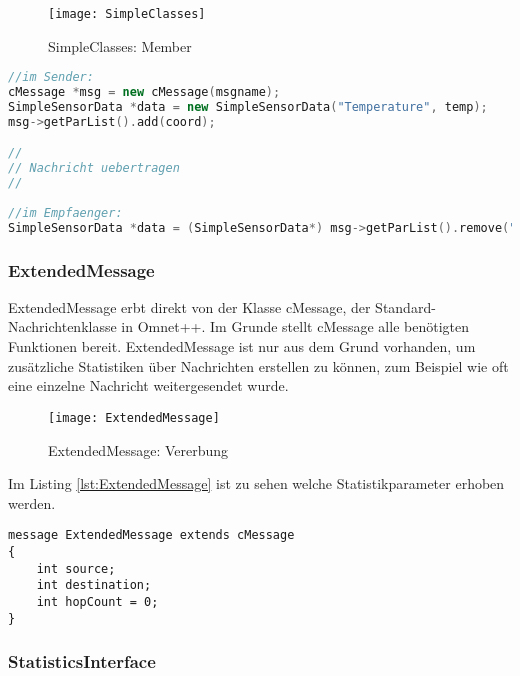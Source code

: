 \begin{figure}[htbp]
\centering
\caption{SimpleClasses: Member}
\texttt{[image: SimpleClasses]}
\end{figure}

\begin{minipage}{\textwidth}
\begin{lstlisting}[language=C++, label=lst:SimpleExample, caption=Beispiel für Senden und Empfangen mit Parameterliste]
//im Sender:
cMessage *msg = new cMessage(msgname);
SimpleSensorData *data = new SimpleSensorData("Temperature", temp);
msg->getParList().add(coord);

//
// Nachricht uebertragen    
//  
  
//im Empfaenger:  
SimpleSensorData *data = (SimpleSensorData*) msg->getParList().remove("Temperature");
\end{lstlisting}
\end{minipage}
\subsubsection{ExtendedMessage}

ExtendedMessage erbt direkt von der Klasse cMessage, der Standard-Nachrichtenklasse in Omnet++. Im Grunde stellt cMessage alle benötigten Funktionen bereit. ExtendedMessage ist nur aus dem Grund vorhanden, um zusätzliche Statistiken über Nachrichten erstellen zu können, zum Beispiel wie oft eine einzelne Nachricht weitergesendet wurde.

\begin{figure}[htbp]
\centering
\caption{ExtendedMessage: Vererbung}
\texttt{[image: ExtendedMessage]}
\end{figure}

Im Listing \ref{lst:ExtendedMessage} ist zu sehen welche Statistikparameter erhoben werden.

\begin{minipage}{\textwidth}
\begin{lstlisting}[language=NED, label=lst:ExtendedMessage, caption=ExtendedMessage]
message ExtendedMessage extends cMessage
{
    int source;
    int destination;
    int hopCount = 0;    
}
\end{lstlisting}
\end{minipage}

\subsubsection{StatisticsInterface}

